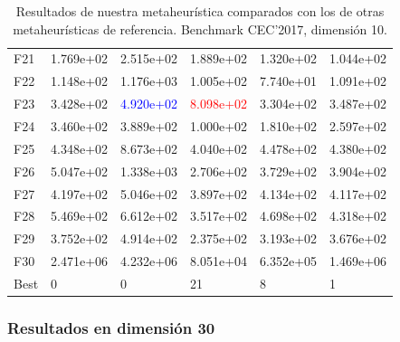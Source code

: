 \documentclass{article}
\begin{document}
\begin{table}[H]
\begin{tabular}{|l|lllll|}
		F21  &  1.769e+02 &  2.515e+02 	 &  1.889e+02 &  1.320e+02 &  1.044e+02 \\
		F22  &  1.148e+02 &  1.176e+03 	 &  1.005e+02 &  7.740e+01 &  1.091e+02 \\
		F23  &  3.428e+02 &  \textcolor{blue}{4.920e+02} 	 &  \textcolor{red}{8.098e+02} &  3.304e+02 &  3.487e+02 \\
		F24  &  3.460e+02 &  3.889e+02 	 &  1.000e+02 &  1.810e+02 &  2.597e+02 \\
		F25  &  4.348e+02 &  8.673e+02 &  4.040e+02 &  4.478e+02 &  4.380e+02 \\
		F26  &  5.047e+02 &  1.338e+03 	 &  2.706e+02 &  3.729e+02 &  3.904e+02 \\
		F27  &  4.197e+02 &  5.046e+02 	 &  3.897e+02 &  4.134e+02 &  4.117e+02 \\
		F28  &  5.469e+02 &  6.612e+02 	 &  3.517e+02 &  4.698e+02 &  4.318e+02 \\
		F29  &  3.752e+02 &  4.914e+02 &  2.375e+02 &  3.193e+02 &  3.676e+02 \\
		F30  &  2.471e+06 &  4.232e+06 	 &  8.051e+04 &  6.352e+05 &  1.469e+06 \\\hline
		Best &          0 &          0 &         21 &          8 &          1 \\
		\hline
	\end{tabular}
	\caption{Resultados de nuestra metaheurística comparados con los de otras metaheurísticas de referencia. Benchmark CEC'2017, dimensión 10.}
	\label{tab:branch-10}
\end{table}

\subsubsection*{Resultados en dimensión 30}
\end{document}

